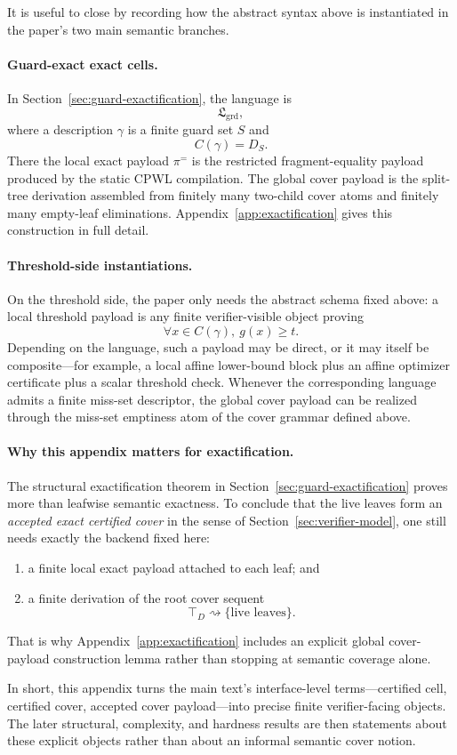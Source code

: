 It is useful to close by recording how the abstract syntax above is instantiated in the paper's two main semantic branches.

\paragraph{Guard-exact exact cells.}
In Section~\ref{sec:guard-exactification}, the language is
\[
\mathfrak L_{\mathrm{grd}},
\]
where a description $\gamma$ is a finite guard set $S$ and
\[
C(\gamma)=D_S.
\]
There the local exact payload $\pi^{=}$ is the restricted fragment-equality payload produced by the static CPWL compilation. The global cover payload is the split-tree derivation assembled from finitely many two-child cover atoms and finitely many empty-leaf eliminations. Appendix~\ref{app:exactification} gives this construction in full detail.

\paragraph{Threshold-side instantiations.}
On the threshold side, the paper only needs the abstract schema fixed above: a local threshold payload is any finite verifier-visible object proving
\[
\forall x\in C(\gamma),\ g(x)\ge t.
\]
Depending on the language, such a payload may be direct, or it may itself be composite---for example, a local affine lower-bound block plus an affine optimizer certificate plus a scalar threshold check. Whenever the corresponding language admits a finite miss-set descriptor, the global cover payload can be realized through the miss-set emptiness atom of the cover grammar defined above.

\paragraph{Why this appendix matters for exactification.}
The structural exactification theorem in Section~\ref{sec:guard-exactification} proves more than leafwise semantic exactness. To conclude that the live leaves form an \emph{accepted exact certified cover} in the sense of Section~\ref{sec:verifier-model}, one still needs exactly the backend fixed here:
\begin{enumerate}
    \item a finite local exact payload attached to each leaf; and
    \item a finite derivation of the root cover sequent
    \[
    \top_D \rightsquigarrow \{\text{live leaves}\}.
    \]
\end{enumerate}
That is why Appendix~\ref{app:exactification} includes an explicit global cover-payload construction lemma rather than stopping at semantic coverage alone.

In short, this appendix turns the main text's interface-level terms---certified cell, certified cover, accepted cover payload---into precise finite verifier-facing objects. The later structural, complexity, and hardness results are then statements about these explicit objects rather than about an informal semantic cover notion.
